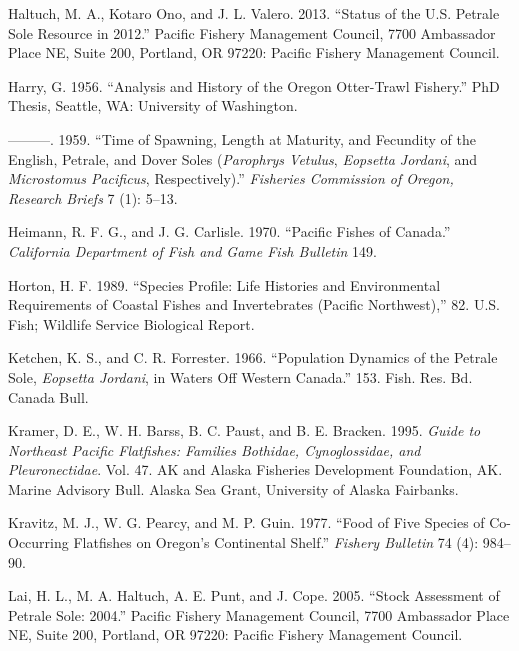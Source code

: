 \documentclass[11pt,
  english,
  letterpaper,
]{article}
\newlength{\cslhangindent}
\newenvironment{cslreferences}%
  {\setlength{\parindent}{0pt}%
  \everypar{\setlength{\hangindent}{\cslhangindent}}\ignorespaces}%
  {\par}
\begin{document}
\begin{cslreferences}
\leavevmode\hypertarget{ref-haltuch_status_2013}{}%
Haltuch, M. A., Kotaro Ono, and J. L. Valero. 2013. ``Status of the U.S. Petrale Sole Resource in 2012.'' Pacific Fishery Management Council, 7700 Ambassador Place NE, Suite 200, Portland, OR 97220: Pacific Fishery Management Council.

\leavevmode\hypertarget{ref-harry_analysis_1956}{}%
Harry, G. 1956. ``Analysis and History of the Oregon Otter-Trawl Fishery.'' PhD Thesis, Seattle, WA: University of Washington.

\leavevmode\hypertarget{ref-harry_time_1959}{}%
---------. 1959. ``Time of Spawning, Length at Maturity, and Fecundity of the English, Petrale, and Dover Soles (\emph{Parophrys Vetulus}, \emph{Eopsetta Jordani}, and \emph{Microstomus Pacificus}, Respectively).'' \emph{Fisheries Commission of Oregon, Research Briefs} 7 (1): 5--13.

\leavevmode\hypertarget{ref-heimann_pacific_1970}{}%
Heimann, R. F. G., and J. G. Carlisle. 1970. ``Pacific Fishes of Canada.'' \emph{California Department of Fish and Game Fish Bulletin} 149.

\leavevmode\hypertarget{ref-horton_species_1989}{}%
Horton, H. F. 1989. ``Species Profile: Life Histories and Environmental Requirements of Coastal Fishes and Invertebrates (Pacific Northwest),'' 82. U.S. Fish; Wildlife Service Biological Report.

\leavevmode\hypertarget{ref-ketchen_population_1966}{}%
Ketchen, K. S., and C. R. Forrester. 1966. ``Population Dynamics of the Petrale Sole, \emph{Eopsetta Jordani}, in Waters Off Western Canada.'' 153. Fish. Res. Bd. Canada Bull.

\leavevmode\hypertarget{ref-kramer_guide_1995}{}%
Kramer, D. E., W. H. Barss, B. C. Paust, and B. E. Bracken. 1995. \emph{Guide to Northeast Pacific Flatfishes: Families Bothidae, Cynoglossidae, and Pleuronectidae}. Vol. 47. AK and Alaska Fisheries Development Foundation, AK. Marine Advisory Bull. Alaska Sea Grant, University of Alaska Fairbanks.

\leavevmode\hypertarget{ref-kravitz_food_1977}{}%
Kravitz, M. J., W. G. Pearcy, and M. P. Guin. 1977. ``Food of Five Species of Co-Occurring Flatfishes on Oregon's Continental Shelf.'' \emph{Fishery Bulletin} 74 (4): 984--90.

\leavevmode\hypertarget{ref-lai_stock_2005}{}%
Lai, H. L., M. A. Haltuch, A. E. Punt, and J. Cope. 2005. ``Stock Assessment of Petrale Sole: 2004.'' Pacific Fishery Management Council, 7700 Ambassador Place NE, Suite 200, Portland, OR 97220: Pacific Fishery Management Council.


\end{cslreferences}
\end{document}
